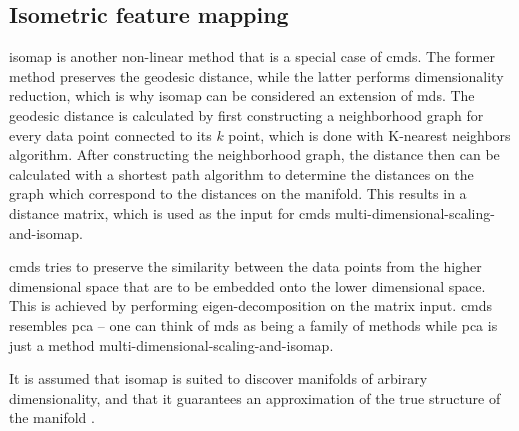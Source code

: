 \begin{comment}
@misc{kernel-pca,
  doi = {10.48550/ARXIV.1207.3538},
  url = \url{https://arxiv.org/abs/1207.3538},
  author = {Wang, Quan},
  title = {Kernel Principal Component Analysis and its Applications in Face Recognition and Active Shape Models},
  year = {2012},
}

\end{comment}

\subsection{Isometric feature mapping}\label{subsec:isometric-feature-mapping}
\gls{isomap} is another non-linear method that is a special case of \gls{cmds}. The former method preserves the geodesic distance, while the latter performs dimensionality reduction, which is why \gls{isomap} can be considered an extension of \gls{mds}. The geodesic distance is calculated by first constructing a neighborhood graph for every data point connected to its $k$ point, which is done with K-nearest neighbors algorithm. After constructing the neighborhood graph, the distance then can be calculated with a shortest path algorithm to determine the distances on the graph which correspond to the distances on the manifold. This results in a distance matrix, which is used as the input for \gls{cmds} multi-dimensional-scaling-and-isomap.


\begin{comment}
    @misc{multi-dimensional-scaling-and-isomap,
  doi = {10.48550/ARXIV.2009.08136},
  url = \url{https://arxiv.org/abs/2009.08136},
  author = {Ghojogh, Benyamin and Ghodsi, Ali and Karray, Fakhri and Crowley, Mark},
  title = {Multidimensional Scaling, Sammon Mapping, and Isomap: Tutorial and Survey},
  publisher = {arXiv},
  year = {2020},
}

\end{comment}

\gls{cmds} tries to preserve the similarity between the data points from the higher dimensional space that are to be embedded onto the lower dimensional space. This is achieved by performing eigen-decomposition on the matrix input. \gls{cmds} resembles \gls{pca} -- one can think of \gls{mds} as being a family of methods while \gls{pca} is just a method \cite{difference-between-pca-and-mds} multi-dimensional-scaling-and-isomap.


\begin{comment}
    @misc{difference-between-pca-and-mds,
      url          = \url{https://stats.stackexchange.com/questions/14002/whats-the-difference-between-principal-component-analysis-and-multidimensional},
      title        = {What's the difference between principal component analysis and multidimensional scaling?},
      urldate      = {2022-10-11}
    }
\end{comment}

It is assumed that \gls{isomap} is suited to discover manifolds of arbirary dimensionality, and that it guarantees an approximation of the true structure of the manifold \cite{Tennenbaum}.
